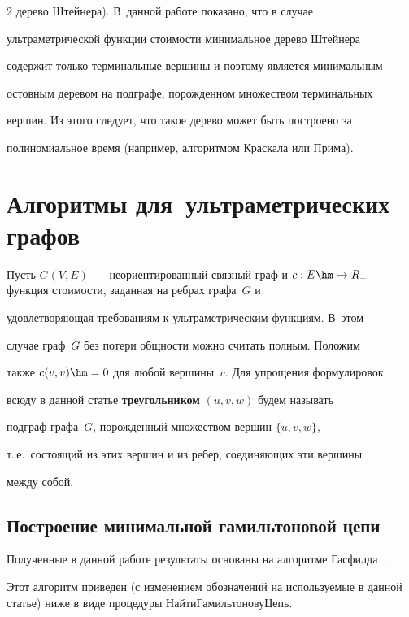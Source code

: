 \begin{multicols}{2}
дерево Штейнера). В~данной работе показано, что в случае


ультраметрической функции стоимости минимальное дерево Штейнера


содержит только терминальные вершины и поэтому является минимальным


остовным деревом на подграфе, порожденном множеством терминальных


вершин. Из этого следует, что такое дерево может быть построено за


полиномиальное время (например, алгоритмом Краскала или Прима).





\section{Алгоритмы для~ультраметрических графов}





Пусть $G(V,E)$~--- неориентированный связный граф и $c: E\hm\rightarrow


R_{+}$~--- функция стоимости, заданная на ребрах графа~$G$ и


удовлетворяющая требованиям к ультраметрическим функциям. В~этом


случае граф~$G$ без потери общности можно считать полным. Положим


также $c(v,v)\hm=0$ для любой вершины~$v$. Для упрощения формулировок


всюду в данной статье \textbf{треугольником} $(u,v,w)$ будем называть


подграф графа~$G$, порожденный множеством вершин $\{ u, v, w\}$,


т.\,е.\ состоящий из этих вершин и из ребер, соединяющих эти вершины


между собой.





\subsection{Построение минимальной гамильтоновой цепи}





Полученные в данной работе результаты основаны на алгоритме Гас\-фил\-да~\cite{Gusfield}.


Этот алгоритм приведен (с изменением обозначений на используемые в данной статье) ниже в виде процедуры {\sf НайтиГамильтоновуЦепь}.



\end{multicols}
